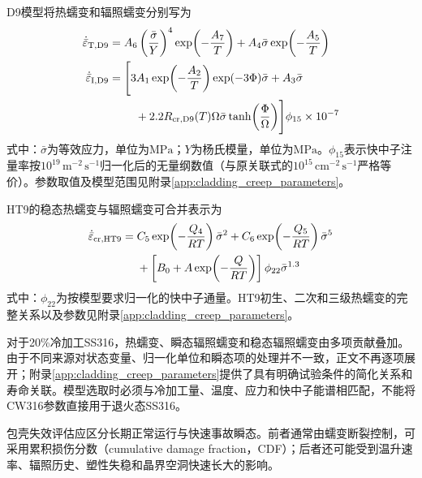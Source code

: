 D9模型将热蠕变和辐照蠕变分别写为\cite{hofmanMetallicFuelsHandbook2019,halesBISONTheoryManual2016}
\begin{subequations}\label{eq:d9_creep_rate}
	\begin{align}
		\dot{\bar\varepsilon}_{\mathrm T,\mathrm{D9}}
		={}&A_6\left(\frac{\bar\sigma}{Y}\right)^4
		\exp\!\left(-\frac{A_7}{T}\right)
		+A_4\bar\sigma\exp\!\left(-\frac{A_5}{T}\right)
		\label{eq:d9_thermal_creep_rate}\\
		\dot{\bar\varepsilon}_{\mathrm I,\mathrm{D9}}
		={}&\Biggl[
		3A_1\exp\!\left(-\frac{A_2}{T}\right)
		\exp(-3\Phi)\bar\sigma
		+A_3\bar\sigma
		\notag\\
		&\quad
		+2.2R_{\mathrm{cr,D9}}(T)\Omega\bar\sigma
		\tanh\!\left(\frac{\Phi}{\Omega}\right)
		\Biggr]\phi_{15}\times10^{-7}
		\label{eq:d9_irradiation_creep_rate}
	\end{align}
\end{subequations}
式中：$\bar\sigma$为等效应力，单位为$\mathrm{MPa}$；$Y$为杨氏模量，单位为$\mathrm{MPa}$。$\phi_{15}$表示快中子注量率按$10^{19}\,\mathrm{m^{-2}\,s^{-1}}$归一化后的无量纲数值（与原关联式的$10^{15}\,\mathrm{cm^{-2}\,s^{-1}}$严格等价）。参数取值及模型范围见附录\ref{app:cladding_creep_parameters}。

HT9的稳态热蠕变与辐照蠕变可合并表示为\cite{hofmanMetallicFuelsHandbook2019,halesBISONTheoryManual2016}
\begin{align}
	\dot{\bar\varepsilon}_{\mathrm{cr,HT9}}
	={}&C_5\exp\!\left(-\frac{Q_4}{RT}\right)\bar\sigma^2
	+C_6\exp\!\left(-\frac{Q_5}{RT}\right)\bar\sigma^5
	\notag\\
	&+\left[
	B_0+A\exp\!\left(-\frac{Q}{RT}\right)
	\right]\phi_{22}\bar\sigma^{1.3}
	\label{eq:ht9_steady_creep_rate}
\end{align}
式中：$\phi_{22}$为按模型要求归一化的快中子通量。HT9初生、二次和三级热蠕变的完整关系以及参数见附录\ref{app:cladding_creep_parameters}。

对于20\%冷加工SS316，热蠕变、瞬态辐照蠕变和稳态辐照蠕变由多项贡献叠加。由于不同来源对状态变量、归一化单位和瞬态项的处理并不一致，正文不再逐项展开；附录\ref{app:cladding_creep_parameters}提供了具有明确试验条件的简化关系和寿命关联。模型选取时必须与冷加工量、温度、应力和快中子能谱相匹配，不能将CW316参数直接用于退火态SS316。

\label{sec:cladding_failure_models}

包壳失效评估应区分长期正常运行与快速事故瞬态。前者通常由蠕变断裂控制，可采用累积损伤分数（cumulative damage fraction，CDF）；后者还可能受到温升速率、辐照历史、塑性失稳和晶界空洞快速长大的影响\cite{FanningSAS4ASASSYS1Safety2017,KARAHAN2010283}。

